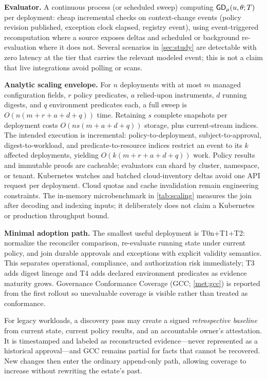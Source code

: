 \textbf{Evaluator.} A continuous process (or scheduled sweep) computing
$\mathsf{GD}_{\mu}(u,\theta;T)$ per deployment: cheap incremental checks on context-change events
(policy revision published, exception clock elapsed, registry event), using
event-triggered recomputation where a source exposes deltas and scheduled or
background re-evaluation where it does not. Several scenarios
in \cref{sec:study} are detectable with zero latency at the tier that
carries the relevant modeled event; this is not a claim that live integrations
avoid polling or scans.

\textbf{Analytic scaling envelope.} For $n$ deployments with at most $m$
managed configuration fields, $r$ policy predicates, $a$ relied-upon
instruments, $d$ running digests, and $q$ environment predicates each, a full
sweep is $O(n(m+r+a+d+q))$ time. Retaining $s$ complete snapshots per
deployment costs $O(ns(m+a+d+q))$ storage, plus current-stream indices. The
intended execution is incremental: policy-to-deployment,
subject-to-approval, digest-to-workload, and predicate-to-resource indices
restrict an event to its $k$ affected deployments, yielding
$O(k(m+r+a+d+q))$ work. Policy results and immutable proofs are cacheable;
evaluators can shard by cluster, namespace, or tenant. Kubernetes watches and
batched cloud-inventory deltas avoid one API request per deployment. Cloud
quotas and cache invalidation remain engineering constraints. The in-memory
microbenchmark in \cref{tab:scaling} measures the join after decoding and
indexing inputs; it deliberately does not claim a Kubernetes or production
throughput bound.

\textbf{Minimal adoption path.} The smallest useful deployment is
T0n+T1+T2: normalize the reconciler comparison, re-evaluate running state
under current policy, and join durable approvals and exceptions with explicit
validity semantics. This separates operational, compliance, and authorization
risk immediately; T3 adds digest lineage and T4 adds declared environment
predicates as evidence maturity grows. Governance Conformance Coverage (GCC;
\cref{met:gcc}) is reported from the first rollout so unevaluable coverage is
visible rather than treated as conformance.

For legacy workloads, a discovery pass may create a signed
\emph{retrospective baseline} from current state, current policy results, and
an accountable owner's attestation. It is timestamped and labeled as
reconstructed evidence---never represented as a historical approval---and
GCC remains partial for facts that cannot be recovered. New changes then enter
the ordinary append-only path, allowing coverage to increase without
rewriting the estate's past.

